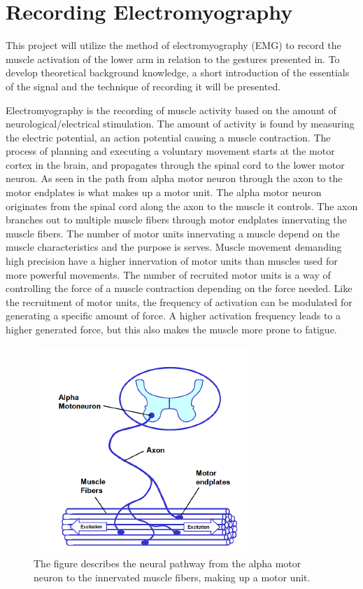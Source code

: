 

\section{Recording Electromyography} 

This project will utilize the method of electromyography (EMG) to record the muscle activation of the lower arm in relation to the gestures presented in. To develop theoretical background knowledge, a short introduction of the essentials of the signal and the technique of recording it will be presented. 


Electromyography is the recording of muscle activity based on the amount of neurological/electrical stimulation. The amount of activity is found by measuring the electric potential, an action potential causing a muscle contraction. The process of planning and executing a voluntary movement starts at the motor cortex in the brain, and propagates through the spinal cord to the lower motor neuron. As seen in  the path from alpha motor neuron through the axon to the motor endplates is what makes up a motor unit. The alpha motor neuron originates from the spinal cord along the axon to the muscle it controls. The axon branches out to multiple muscle fibers through motor endplates innervating the muscle fibers. The number of motor units innervating a muscle depend on the muscle characteristics and the purpose is serves. Muscle movement demanding high precision have a higher innervation of motor units than muscles used for more powerful movements. The number of recruited motor units is a way of controlling the force of a muscle contraction depending on the force needed. Like the recruitment of motor units, the frequency of activation can be modulated for generating a specific amount of force. A higher activation frequency leads to a higher generated force, but this also makes the muscle more prone to fatigue.\cite{Cram2012,Martini2012}       

\begin{figure}[H]                                         
	\includegraphics[width=.4\textwidth]{figures/motor_unit}  
	\caption{The figure describes the neural pathway from the alpha motor neuron to the innervated muscle fibers, making up a motor unit.\cite{Konrad2005}}
	\label{fig:motor} 
\end{figure}  

